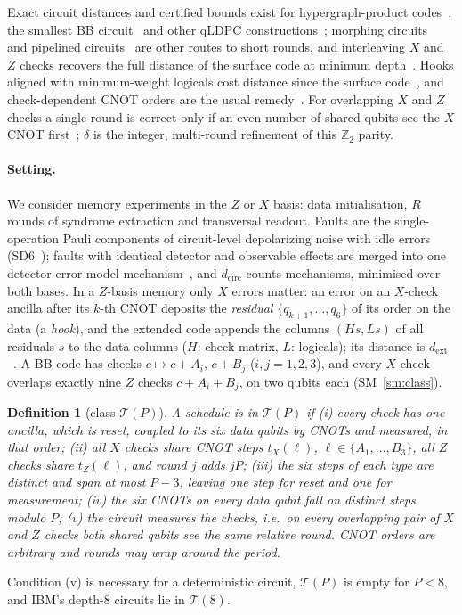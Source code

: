 \documentclass[aps,prl,twocolumn,superscriptaddress,nofootinbib]{revtex4-2}
\newif\ifshowclaimtags \showclaimtagsfalse
\newcommand{\cl}[1]{\ifshowclaimtags\textsuperscript{\textcolor{blue}{\scriptsize[#1]}}\fi}
\newcommand{\dcirc}{d_{\mathrm{circ}}}
\newcommand{\dext}{d_{\mathrm{ext}}}
\newcommand{\T}{\mathcal{T}}
\newtheorem{definition}{Definition}
\begin{document}
Exact circuit distances and certified bounds exist for hypergraph-product
codes~\cite{ManesClaes}, the smallest BB circuit~\cite{Webster2026} and other qLDPC
constructions~\cite{Liang2026,Ghosh2026}; morphing circuits~\cite{ShawTerhal2025,Wills2026}
and pipelined circuits~\cite{Xu2023} are other routes to short rounds, and interleaving
$X$ and $Z$ checks recovers the full distance of the surface code at minimum
depth~\cite{Hirai2026}. Hooks aligned with minimum-weight logicals cost distance since the
surface code~\cite{Dennis2002}, and check-dependent CNOT orders are the usual
remedy~\cite{TomitaSvore,KishonyFowler,Strikis2026}. For overlapping $X$ and $Z$ checks a
single round is correct only if an even number of shared qubits see the $X$ CNOT
first~\cite{Li2025parity,Zhang2026ASC,DurazoRocha2026}; $\delta$ is the integer, multi-round refinement of
this $\mathbb Z_2$ parity\cl{L-21}.

\paragraph{Setting.}
We consider memory experiments in the $Z$ or $X$ basis: data initialisation, $R$ rounds
of syndrome extraction and transversal readout. Faults are the single-operation Pauli
components of circuit-level depolarizing noise with idle errors
(SD6~\cite{Gidney2021honeycomb}); faults with identical detector and observable effects
are merged into one detector-error-model mechanism~\cite{Gidney2021stim}, and $\dcirc$
counts mechanisms, minimised over both bases. In a $Z$-basis memory only $X$ errors
matter: an error on an $X$-check ancilla after its $k$-th CNOT deposits the
\emph{residual} $\{q_{k+1},\dots,q_6\}$ of its order on the data (a \emph{hook}), and
the extended code appends the columns $(Hs,Ls)$ of all residuals $s$ to the data columns
($H$: check matrix, $L$: logicals); its distance is $\dext$~\cite{Strikis2026}. A
BB code has checks $c\mapsto c+A_i$, $c+B_j$ ($i,j=1,2,3$), and every $X$ check
overlaps exactly nine $Z$ checks $c+A_i+B_j$, on two qubits each (SM~\ref{sm:class}).

\begin{definition}[class $\T(P)$]
A schedule is in $\T(P)$ if (i) every check has one ancilla, which is reset, coupled to
its six data qubits by CNOTs and measured, in that order; (ii) all $X$ checks share CNOT
steps $t_X(\ell)$, $\ell\in\{A_1,\dots,B_3\}$, all $Z$ checks share $t_Z(\ell)$, and round
$j$ adds $jP$; (iii) the six steps of each type are distinct and span at most $P-3$, leaving
one step for reset and one for measurement; (iv) the six CNOTs on every data qubit fall on
distinct steps modulo $P$; (v) the circuit measures the checks, i.e.\ on every overlapping
pair of $X$ and $Z$ checks both shared qubits see the same relative round. CNOT orders are
arbitrary and rounds may wrap around the period.
\end{definition}
\noindent Condition (v) is necessary for a deterministic circuit, $\T(P)$ is empty for
$P<8$, and IBM's depth-8 circuits lie in $\T(8)$\cl{L-1}.
\end{document}
